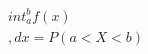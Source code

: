 \documentclass[preview]{standalone}
\begin{document}
\begin{align*}
\quad\\int_{a}^{b} f(x) \quad\\,dx = P(a < X < b)
\end{align*}
\end{document}

